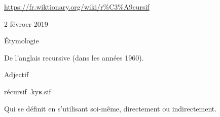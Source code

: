 \url{https://fr.wiktionary.org/wiki/r%C3%A9cursif}

2 févroer 2019

Étymologie

    De l’anglais recursive (dans les années 1960).

Adjectif

récursif .kyʁ.sif\

    Qui se définit en s’utilisant soi-même, directement ou indirectement.